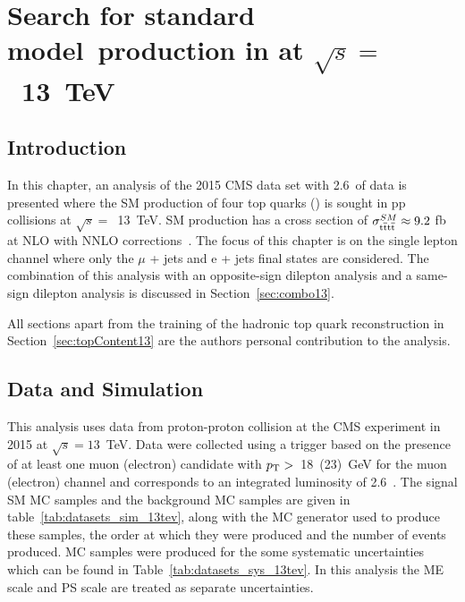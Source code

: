 \chapter{Search for standard model~\tttt production in \runtwo at $\sqrt{s} =$~13~TeV \label{c:Run2}}
\section{Introduction}
In this chapter, an analysis of the 2015 CMS data set with 2.6~\fbinv of data is presented where the SM production of four top quarks (\tttt) is sought in pp collisions at $\sqrt{s} =$~13~TeV. SM \tttt production has a cross section of $\sigma_{{\mathrm{t}\overline{\mathrm{t}}\mathrm{t}\overline{\mathrm{t}}}}^{SM}  \approx 9.2$ fb at NLO with NNLO corrections~\cite{Alwall2014,Bevilacqua2012}. The focus of this chapter is on the single lepton channel where only the $\mu$ + jets and e + jets final states are considered. The combination of this analysis with an opposite-sign dilepton analysis and a same-sign dilepton analysis is discussed in Section~\ref{sec:combo13}.

All sections apart from the training of the hadronic top quark reconstruction in Section~\ref{sec:topContent13} are the authors personal contribution to the analysis.

\section{Data and Simulation}
\label{sec:datasimulation13}
This analysis uses data from proton-proton collision at the CMS experiment in 2015 at $\sqrt{s}=13$~TeV.
Data were collected using a trigger based on the presence of at least one muon (electron) candidate with $p_{\mathrm{T}} > $~18~(23)~GeV for the muon (electron) channel and corresponds to an integrated luminosity of 2.6~\fbinv .
The signal SM \tttt MC samples and the background MC samples are given in table~\ref{tab:datasets_sim_13tev}, along with the MC generator used to produce these samples, the order at which they were produced and the number of events produced. MC samples were produced for the some systematic uncertainties which can be found in Table~\ref{tab:datasets_sys_13tev}. In this analysis the ME scale and PS scale are treated as separate uncertainties.

